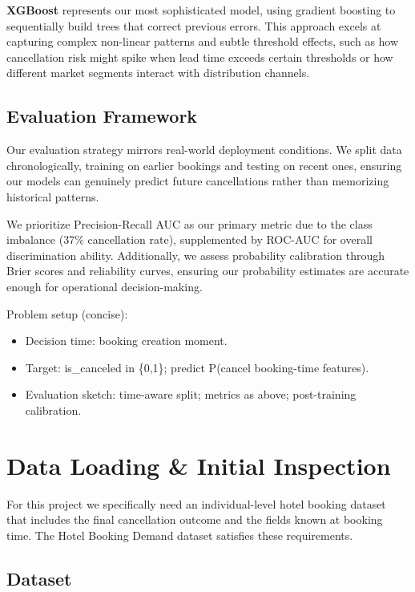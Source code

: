 \documentclass[
  letterpaper,
  DIV=11,
  numbers=noendperiod]{scrartcl}
\providecommand{\tightlist}{%
  \setlength{\itemsep}{0pt}\setlength{\parskip}{0pt}}
\begin{document}
\textbf{XGBoost} represents our most sophisticated model, using gradient
boosting to sequentially build trees that correct previous errors. This
approach excels at capturing complex non-linear patterns and subtle
threshold effects, such as how cancellation risk might spike when lead
time exceeds certain thresholds or how different market segments
interact with distribution channels.

\subsection{Evaluation Framework}\label{evaluation-framework}

Our evaluation strategy mirrors real-world deployment conditions. We
split data chronologically, training on earlier bookings and testing on
recent ones, ensuring our models can genuinely predict future
cancellations rather than memorizing historical patterns.

We prioritize Precision-Recall AUC as our primary metric due to the
class imbalance (37\% cancellation rate), supplemented by ROC-AUC for
overall discrimination ability. Additionally, we assess probability
calibration through Brier scores and reliability curves, ensuring our
probability estimates are accurate enough for operational
decision-making.

Problem setup (concise):

\begin{itemize}
\tightlist
\item
  Decision time: booking creation moment.
\item
  Target: is\_canceled in \{0,1\}; predict P(cancel \textbar{}
  booking-time features).
\item
  Evaluation sketch: time-aware split; metrics as above; post-training
  calibration.
\end{itemize}

\section{Data Loading \& Initial
Inspection}\label{data-loading-initial-inspection}

For this project we specifically need an individual-level hotel booking
dataset that includes the final cancellation outcome and the fields
known at booking time. The Hotel Booking Demand dataset satisfies these
requirements.

\subsection{Dataset}\label{dataset}
\end{document}

